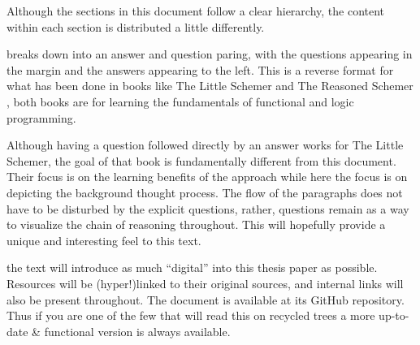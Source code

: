 
Although the sections in this document follow a clear hierarchy, the content within each section is distributed a little differently.

 breaks down into an answer and question paring, with the questions appearing in the margin and the answers appearing to the left. This is a reverse format for what has been done in books like The Little Schemer \cite{littleSchemer} and The Reasoned Schemer \cite{reasonedSchemer}, both books are for learning the fundamentals of functional and logic programming.

Although having a question followed directly by an answer works for The Little Schemer, the goal of that book is fundamentally different from this document. Their focus is on the learning benefits of the approach while here the focus is on depicting the background thought process. The flow of the paragraphs does not have to be disturbed by the explicit questions, rather, questions remain as a way to visualize the chain of reasoning throughout. This will hopefully provide a unique and interesting feel to this text.

 the text will introduce as much ``digital'' into this thesis paper as possible. Resources will be (hyper!)linked to their original sources, and internal links will also be present throughout. The document is available at its GitHub repository. Thus if you are one of the few that will read this on recycled trees a more up-to-date \& functional version is always available.